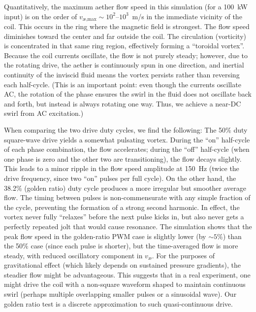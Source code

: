 \documentclass[twocolumn,aps,pre,floatfix,nofootinbib]{revtex4-2}
\begin{document}

Quantitatively, the maximum aether flow speed in this simulation (for a 100~kW input) is on the order of $v_{\text{æ,max}}\sim10^2$–$10^3$~m/s in the immediate vicinity of the coil. This occurs in the ring where the magnetic field is strongest. The flow speed diminishes toward the center and far outside the coil. The circulation (vorticity) is concentrated in that same ring region, effectively forming a “toroidal vortex”. Because the coil currents oscillate, the flow is not purely steady; however, due to the rotating drive, the aether is continuously spun in one direction, and inertial continuity of the inviscid fluid means the vortex persists rather than reversing each half-cycle. (This is an important point: even though the currents oscillate AC, the rotation of the phase ensures the swirl in the fluid does not oscillate back and forth, but instead is always rotating one way. Thus, we achieve a near-DC swirl from AC excitation.)


When comparing the two drive duty cycles, we find the following: The 50\% duty square-wave drive yields a somewhat pulsating vortex. During the “on” half-cycle of each phase combination, the flow accelerates; during the “off” half-cycle (when one phase is zero and the other two are transitioning), the flow decays slightly. This leads to a minor ripple in the flow speed amplitude at 150~Hz (twice the drive frequency, since two “on” pulses per full cycle). On the other hand, the 38.2\% (golden ratio) duty cycle produces a more irregular but smoother average flow. The timing between pulses is non-commensurate with any simple fraction of the cycle, preventing the formation of a strong second harmonic. In effect, the vortex never fully “relaxes” before the next pulse kicks in, but also never gets a perfectly repeated jolt that would cause resonance. The simulation shows that the peak flow speed in the golden-ratio PWM case is slightly lower (by $\sim5\%$) than the 50\% case (since each pulse is shorter), but the time-averaged flow is more steady, with reduced oscillatory component in $v_{\text{æ}}$. For the purposes of gravitational effect (which likely depends on sustained pressure gradients), the steadier flow might be advantageous. This suggests that in a real experiment, one might drive the coil with a non-square waveform shaped to maintain continuous swirl (perhaps multiple overlapping smaller pulses or a sinusoidal wave). Our golden ratio test is a discrete approximation to such quasi-continuous drive.
\end{document}
